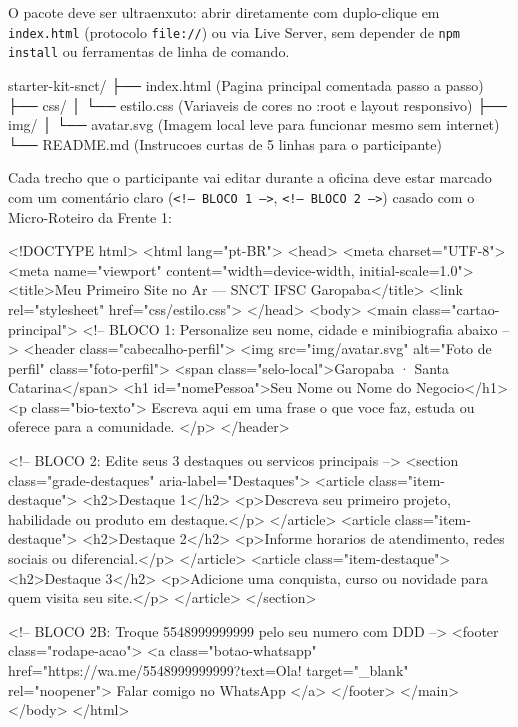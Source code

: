 O pacote deve ser ultraenxuto: abrir diretamente com duplo-clique em \texttt{index.html} (protocolo \texttt{file://}) ou via Live Server, sem depender de \texttt{npm install} ou ferramentas de linha de comando.


\begin{arvore}
starter-kit-snct/
├── index.html          (Pagina principal comentada passo a passo)
├── css/
│   └── estilo.css      (Variaveis de cores no :root e layout responsivo)
├── img/
│   └── avatar.svg      (Imagem local leve para funcionar mesmo sem internet)
└── README.md           (Instrucoes curtas de 5 linhas para o participante)
\end{arvore}


Cada trecho que o participante vai editar durante a oficina deve estar marcado com um comentário claro (\texttt{<!-- BLOCO 1 -->}, \texttt{<!-- BLOCO 2 -->}) casado com o Micro-Roteiro da Frente 1:

\begin{boxCodigoHTML}
<!DOCTYPE html>
<html lang="pt-BR">
<head>
  <meta charset="UTF-8">
  <meta name="viewport" content="width=device-width, initial-scale=1.0">
  <title>Meu Primeiro Site no Ar — SNCT IFSC Garopaba</title>
  <link rel="stylesheet" href="css/estilo.css">
</head>
<body>
  <main class="cartao-principal">
    <!-- BLOCO 1: Personalize seu nome, cidade e minibiografia abaixo -->
    <header class="cabecalho-perfil">
      <img src="img/avatar.svg" alt="Foto de perfil" class="foto-perfil">
      <span class="selo-local">Garopaba · Santa Catarina</span>
      <h1 id="nomePessoa">Seu Nome ou Nome do Negocio</h1>
      <p class="bio-texto">
        Escreva aqui em uma frase o que voce faz, estuda ou oferece para a comunidade.
      </p>
    </header>

    <!-- BLOCO 2: Edite seus 3 destaques ou servicos principais -->
    <section class="grade-destaques" aria-label="Destaques">
      <article class="item-destaque">
        <h2>Destaque 1</h2>
        <p>Descreva seu primeiro projeto, habilidade ou produto em destaque.</p>
      </article>
      <article class="item-destaque">
        <h2>Destaque 2</h2>
        <p>Informe horarios de atendimento, redes sociais ou diferencial.</p>
      </article>
      <article class="item-destaque">
        <h2>Destaque 3</h2>
        <p>Adicione uma conquista, curso ou novidade para quem visita seu site.</p>
      </article>
    </section>

    <!-- BLOCO 2B: Troque 5548999999999 pelo seu numero com DDD -->
    <footer class="rodape-acao">
      <a class="botao-whatsapp"
         href="https://wa.me/5548999999999?text=Ola!%
         target="_blank" rel="noopener">
        Falar comigo no WhatsApp
      </a>
    </footer>
  </main>
</body>
</html>
\end{boxCodigoHTML}

